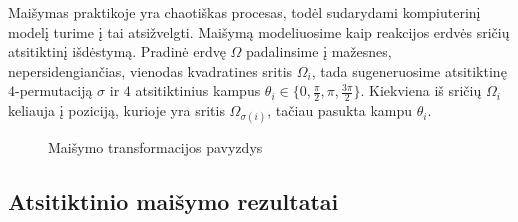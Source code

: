 Maišymas praktikoje yra chaotiškas procesas, todėl sudarydami kompiuterinį modelį turime į tai atsižvelgti. Maišymą modeliuosime kaip reakcijos erdvės sričių atsitiktinį išdėstymą. Pradinė erdvę $\Omega$ padalinsime į mažesnes, nepersidengiančias, vienodas kvadratines sritis $\Omega_i$, tada sugeneruosime atsitiktinę $4$-permutaciją $\sigma$ ir $4$ atsitiktinius kampus $\theta_i \in \{0, \frac{\pi}{2}, \pi, \frac{3\pi}{2}\}$. Kiekviena iš sričių $\Omega_i$ keliauja į poziciją, kurioje yra sritis $\Omega_{\sigma(i)}$, tačiau pasukta kampu $\theta_i$. 

\begin{figure}[!h]
\centering
\label{split-reaction-space}

\caption{Maišymo transformacijos pavyzdys}
\end{figure}

\newpage
\subsection{Atsitiktinio maišymo rezultatai}

